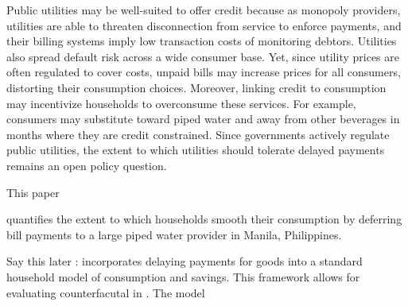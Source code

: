 \documentclass[12pt]{article}
\begin{document}
Public utilities may be well-suited to offer credit because as monopoly providers, utilities are able to threaten disconnection from service to enforce payments, and their billing systems imply low transaction costs of monitoring debtors.  Utilities also spread default risk across a wide consumer base.  Yet, since utility prices are often regulated to cover costs, unpaid bills may increase prices for all consumers, distorting their consumption choices.  Moreover, linking credit to consumption may incentivize households to overconsume these services.  For example, consumers may substitute toward piped water and away from other beverages in months where they are credit constrained.  Since governments actively regulate public utilities, the extent to which utilities should tolerate delayed payments remains an open policy question.




This paper 


quantifies the extent to which households smooth their consumption by deferring bill payments to a large piped water provider in Manila, Philippines.  



Say this later : incorporates delaying payments for goods into a standard household model of consumption and savings.  This framework allows for evaluating counterfacutal in  .  The model 
\end{document}
